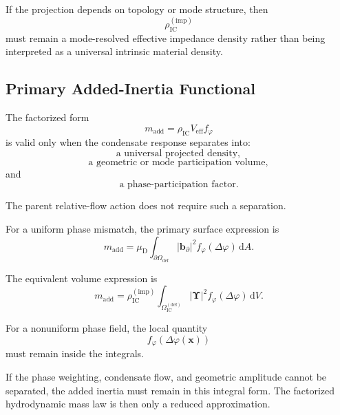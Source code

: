 If the projection depends on topology or mode structure, then
\begin{equation}
    \rho_{\mathrm{IC}}^{(\mathrm{imp})}
\end{equation}
must remain a mode-resolved effective impedance density rather than being interpreted as a universal intrinsic material density.

\subsection{Primary Added-Inertia Functional}

The factorized form
\begin{equation}
    m_{\mathrm{add}} = \rho_{\mathrm{IC}} V_{\mathrm{eff}} f_{\varphi}
\end{equation}
is valid only when the condensate response separates into:
\begin{equation}
    \text{a universal projected density},
\end{equation}
\begin{equation}
    \text{a geometric or mode participation volume},
\end{equation}
and
\begin{equation}
    \text{a phase-participation factor}.
\end{equation}

The parent relative-flow action does not require such a separation.

For a uniform phase mismatch, the primary surface expression is
\begin{equation}
    \boxed{ m_{\mathrm{add}} = \mu_{\mathrm{D}} \int_{\partial\Omega_{\mathrm{def}}} \left| \mathbf{b}_{\partial} \right|^2 f_{\varphi}(\Delta\varphi) \, \mathrm{d}A }.
\end{equation}

The equivalent volume expression is
\begin{equation}
    \boxed{ m_{\mathrm{add}} = \rho_{\mathrm{IC}}^{(\mathrm{imp})} \int_{\Omega_{\mathrm{IC}}^{(\mathrm{def})}} \left| \boldsymbol{\Upsilon} \right|^2 f_{\varphi}(\Delta\varphi) \, \mathrm{d}V }.
\end{equation}

For a nonuniform phase field, the local quantity
\begin{equation}
    f_{\varphi} \left( \Delta\varphi(\mathbf{x}) \right)
\end{equation}
must remain inside the integrals.

If the phase weighting, condensate flow, and geometric amplitude cannot be separated, the added inertia must remain in this integral form. The factorized hydrodynamic mass law is then only a reduced approximation.

